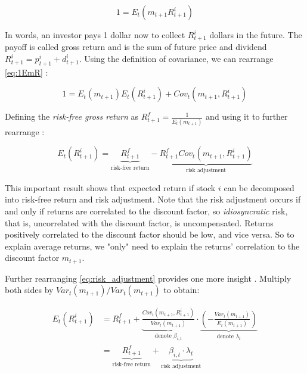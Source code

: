 	 	\begin{equation}
	 		1 = E_t(m_{t+1} R_{t+1}^i ) \label{eq:1EmR}
	 	\end{equation} 
	 	
	 	In words, an investor pays 1 dollar now to collect $R_{t+1}^i$ dollars in the future. The payoff is called gross return and is the sum of future price and dividend $R_{t+1}^i = p_{t+1}^i+ d_{t+1}^i$. 
	 	Using the definition of covariance, we can rearrange \ref{eq:1EmR} \citep{cochrane2009asset}:
	 	
	 	\begin{equation}
	 		1 = E_t(m_{t+1}) E_t(R_{t+1}^i) + Cov_t(m_{t+1},R_{t+1}^i) 
	 	\end{equation} 
 	
 		Defining the \textit{risk-free gross return} as $R_{t+1}^f=\frac{1}{E_t(m_{t+1})}$ and using it to further rearrange \citep{cochrane2009asset}:
 		
 		\begin{equation}
 			E_t(R_{t+1}^i) = \underbrace{R_{t+1}^f}_\text{risk-free return}  -  \underbrace{R_{t+1}^f Cov_t(m_{t+1},R_{t+1}^i)}_\text{risk adjustment} \label{eq:risk_adjustment}
 		\end{equation} 
 		
 		This important result shows that expected return if stock $i$ can be decomposed into risk-free return and risk adjustment. Note that the risk adjustment occurs if and only if returns are correlated to the discount factor, so \textit{idiosyncratic} risk, that is, uncorrelated with the discount factor, is uncompensated. Returns positively correlated to the discount factor should be low, and vice versa. So to explain average returns, we "only" need to explain the returns' correlation to the discount factor $m_{t+1}$. 
 		
 		Further rearranging \ref{eq:risk_adjustment} provides one more insight \citep{cochrane2009asset}. Multiply both sides by $Var_t(m_{t+1})/Var_t(m_{t+1})$ to obtain:
 		
 		\begin{align}
	 		E_t(R_{t+1}^i) 
	 		& = {R_{t+1}^f} + 
	 		\underbrace{
	 			\frac{Cov_t(m_{t+1},R_{t+1}^i)}{Var_t(m_{t+1})}
	 			}_\text{denote $\beta_{i,t}$} 
 			\cdot 
 			\underbrace{
 				\left(-\frac{Var_t(m_{t+1})}{E_t(m_{t+1})}\right)
 				}_\text{denote $\lambda_{t}$} \label{eq:factor_model} \\
 			& = \underbrace{{R_{t+1}^f}
 				}_\text{risk-free return} 
 				+ 
 				\underbrace{\beta_{i,t} \cdot \lambda_{t}
 				}_\text{risk adjustment} \label{eq:beta_reprezentation}
 		\end{align} 
 		
